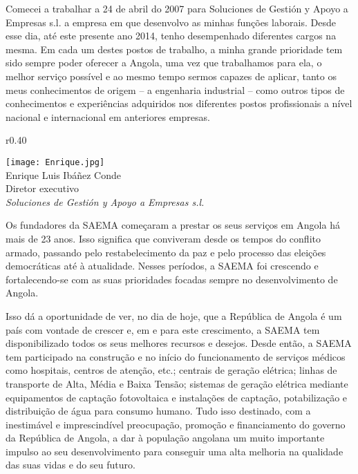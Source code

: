 
\cappar Comecei a trabalhar a 24 de abril do 2007 para Soluciones de Gestión y Apoyo a Empresas s.l. a empresa em que desenvolvo as minhas funções laborais. Desde esse dia, até este presente ano 2014, tenho desempenhado diferentes cargos na mesma. Em cada um destes postos de trabalho, a minha grande prioridade tem sido sempre poder oferecer a Angola, uma vez que trabalhamos para ela, o melhor serviço possível e ao mesmo tempo sermos capazes de aplicar, tanto os meus conhecimentos de origem -- a engenharia industrial -- como outros tipos de conhecimentos e experiências adquiridos nos diferentes postos profissionais a nível nacional e internacional em anteriores empresas.
\begin{wrapfigure}{r}{0.40\textwidth} 
  \vspace{-21pt}
  \begin{figurebox}
   \vspace{20pt}
    \centering
    \texttt{[image: Enrique.jpg]}\\
    Enrique Luis Ibáñez Conde\\ 
    {\small Diretor executivo}\\
    {\sl\small Soluciones de Gestión y Apoyo a Empresas s.l.}
    \vspace{1pt}
  \end{figurebox}
 \vspace{-20pt}
\end{wrapfigure}

Os fundadores da SAEMA começaram a prestar os seus serviços em Angola há mais de 23 anos. Isso significa que conviveram desde os tempos do conflito armado, passando pelo restabelecimento da paz e pelo processo das eleições democráticas até à atualidade. Nesses períodos, a SAEMA foi crescendo e fortalecendo-se com as suas prioridades focadas sempre no desenvolvimento de Angola.

Isso dá a oportunidade de ver, no dia de hoje, que a República de Angola é um país com vontade de crescer e, em e para este crescimento, a SAEMA tem disponibilizado todos os seus melhores recursos e desejos. Desde então, a SAEMA tem participado na construção e no início do funcionamento de serviços médicos como hospitais, centros de atenção, etc.; centrais de geração elétrica; linhas de transporte de Alta, Média e Baixa Tensão; sistemas de geração elétrica mediante equipamentos de captação fotovoltaica e instalações de captação, potabilização e distribuição de água para consumo humano. Tudo isso destinado, com a inestimável e imprescindível preocupação, promoção e financiamento do governo da República de Angola, a dar à população angolana um muito importante impulso ao seu desenvolvimento para conseguir uma alta melhoria na qualidade das suas vidas e do seu futuro.

